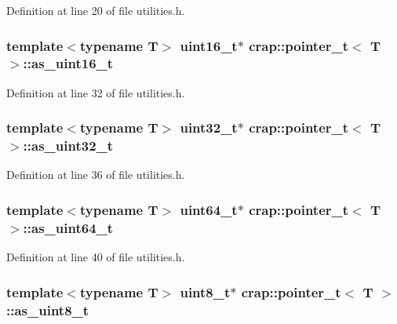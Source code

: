 Definition at line 20 of file utilities.\+h.

\hypertarget{structcrap_1_1pointer__t_a9c9b5ae3d6475830d13c0ab770b9d056}{
\subsubsection[{as\+\_\+uint16\+\_\+t}]{\setlength{\rightskip}{0pt plus 5cm}template$<$typename T$>$ uint16\+\_\+t$\ast$ {\bf crap\+::pointer\+\_\+t}$<$ T $>$\+::as\+\_\+uint16\+\_\+t}}\label{structcrap_1_1pointer__t_a9c9b5ae3d6475830d13c0ab770b9d056}


Definition at line 32 of file utilities.\+h.

\hypertarget{structcrap_1_1pointer__t_adf2f1a4f92a44f4899bab5d1743e0b0b}{
\subsubsection[{as\+\_\+uint32\+\_\+t}]{\setlength{\rightskip}{0pt plus 5cm}template$<$typename T$>$ uint32\+\_\+t$\ast$ {\bf crap\+::pointer\+\_\+t}$<$ T $>$\+::as\+\_\+uint32\+\_\+t}}\label{structcrap_1_1pointer__t_adf2f1a4f92a44f4899bab5d1743e0b0b}


Definition at line 36 of file utilities.\+h.

\hypertarget{structcrap_1_1pointer__t_a7e0460a4477f27ab4fc4279e8ed360ce}{
\subsubsection[{as\+\_\+uint64\+\_\+t}]{\setlength{\rightskip}{0pt plus 5cm}template$<$typename T$>$ uint64\+\_\+t$\ast$ {\bf crap\+::pointer\+\_\+t}$<$ T $>$\+::as\+\_\+uint64\+\_\+t}}\label{structcrap_1_1pointer__t_a7e0460a4477f27ab4fc4279e8ed360ce}


Definition at line 40 of file utilities.\+h.

\hypertarget{structcrap_1_1pointer__t_abc75378cf1e3c1cb65e93c1a765a5c0b}{
\subsubsection[{as\+\_\+uint8\+\_\+t}]{\setlength{\rightskip}{0pt plus 5cm}template$<$typename T$>$ uint8\+\_\+t$\ast$ {\bf crap\+::pointer\+\_\+t}$<$ T $>$\+::as\+\_\+uint8\+\_\+t}}\label{structcrap_1_1pointer__t_abc75378cf1e3c1cb65e93c1a765a5c0b}


